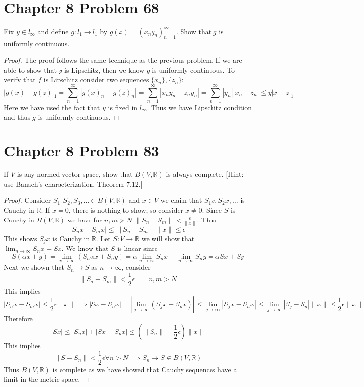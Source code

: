 \documentclass{article}
\newtheorem{proof}{Proof}
\def\le{\leqslant}
\def\to{\rightarrow}
\def\RR{\mathbb R}
\begin{document}
\section{Chapter 8 Problem 68}
Fix $y\in l_\infty$ and define $g:l_1\to l_1$ by $g(x)=(x_ny_n)_{n=1}^\infty$.
Show that $g$ is uniformly continuous.
\begin{proof}
The proof follows the same technique as the previous problem.
If we are able to show that $g$ is Lipschitz, then we know
$g$ is uniformly continuous. 
To verify that $f$
is Lipschitz consider two sequences $\{x_n\},\{z_n\}$:
\[
|g(x)-g(z)|_1 = \sum_{n=1}^\infty | g(x)_n - g(z)_n| = 
\sum_{n=1}^\infty | x_ny_n - z_ny_n| = \sum_{n=1}^\infty |y_n||x_n-z_n| \le
y |x-z|_1
\]
Here we have used the fact that $y$ is fixed in $l_\infty$. Thus
we have Lipschitz condition and thus $g$ is uniformly continuous.
\end{proof}

\section{Chapter 8 Problem 83}
If $V$ is any normed vector space, show that $B(V,\RR)$ is always
complete. [Hint: use Banach's characterization, Theorem 7.12.]
\begin{proof}
Consider $S_1, S_2, S_3,\ldots \in B(V,\RR)$ and $x\in V$ we claim that
$S_1x, S_2x,\ldots$ is Cauchy in $\RR$. If $x=0$, there is nothing to
show, so consider $x\ne 0$. Since $S$ is Cauchy in $B(V,\RR)$ we have 
for $n,m>N$ $\|S_n-S_m\| < \frac{\epsilon}{\|x\|}$. Thus
\[
|S_nx-S_mx| \le \|S_n-S_m\|\|x\| \le \epsilon
\]
This shows $S_jx$ is Cauchy in $\RR$. Let $S:V\to\RR$ we will show
that $\lim_{n\to\infty} S_nx= Sx$. We know that $S$ is linear since
\[
S(\alpha x+y) = \lim_{n\to\infty} (S_n\alpha x+ S_ny) = \alpha \lim_{n\to\infty} S_nx 
+ \lim_{n\to\infty} S_ny = \alpha Sx + Sy
\]
Next we shown that $S_n\to S$ as $n\to\infty$, consider
\[
\|S_n-S_m\| < \frac{1}{2}\epsilon\qquad n,m > N
\]
This implies
\[
|S_nx - S_mx| \le \frac{1}{2}\epsilon\|x\| \implies
|Sx -S_nx| = |\lim_{j\to\infty}(S_jx-S_nx)| \le \lim_{j\to\infty} |S_jx-S_nx| \le
\lim_{j\to\infty} |S_j-S_n|\|x\| \le \frac{1}{2}\epsilon \|x\|
\]
Therefore
\[
|Sx| \le |S_nx| + |Sx - S_nx| \le (\|S_n\| + \frac{1}{2}\epsilon)\|x\|
\]
This implies
\[
\|S-S_n\| < \frac{1}{2}\epsilon \forall n > N \implies S_n \to S \in B(V,\RR)
\]
Thus $B(V,\RR)$ is complete as we have showed that Cauchy sequences
have a limit in the metric space.
\end{proof}
\end{document}
